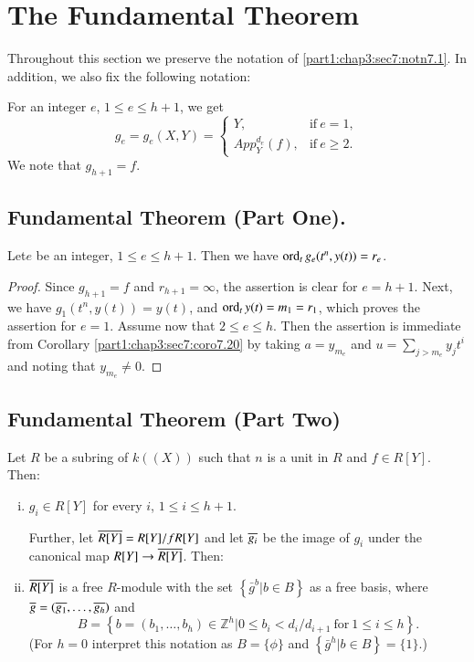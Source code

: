 \section{The Fundamental Theorem}\label{part1:chap3:sec8}

{\rm Throughout this section we preserve the notation of \ref{part1:chap3:sec7:notn7.1}. In addition, we also fix the following notation:}

\begin{notn}\label{part1:chap3:sec8:notn8.1}
  For an integer $e$, $1\leq e \leq h+1$, we get
$$
g_e = g_e (X, Y)= \begin{cases}
  Y, & \text{if}~ e=1,\\
  App_{Y}^{d_e} (f), & \text{if}~ e \geq 2.
\end{cases}
$$
We note that $g_{h+1}=f$.
\end{notn}

\setcounter{subsection}{1}
\subsection{Fundamental Theorem (Part One).} \label{part1:chap3:sec8:ss8.2}

Let\pageoriginale $e$ be an integer, $1 \leq e \leq h+1$. Then we have $\operatorname{ord}_t g_e (t^n, y(t))= r_e$.

\begin{proof}
  Since $g_{h+1}=f$ and $r_{h+1}= \infty$, the assertion is clear for $e= h+1$. Next, we have $g_1 (t^n, y(t))= y(t)$, and $\operatorname{ord}_t y(t) =m_1= r_1$, which proves the assertion for $e=1$. Assume now that $2 \leq e \leq h$. Then the assertion is immediate from Corollary \ref{part1:chap3:sec7:coro7.20} by taking $a= y_{m_e}$ and $u= \displaystyle{\sum_{j > m_e}} y_j t^i$ and noting that $y_{m_e} \neq 0$.
\end{proof}

\subsection{Fundamental Theorem (Part Two)}\label{part1:chap3:sec8:ss8.3}

Let $R$ be a subring of $k ((X))$ such that $n$ is a unit in $R$ and $f \in R [Y]$. Then:

\begin{enumerate}[(i)]
\item $g_i \in R [Y]$ for every $i$, $1 \leq i \leq h+1$.

  Further, let $\overline{R[Y]}= R[Y]/fR[Y]$ and let $\overline{g_i}$ be the image of $g_i$ under the canonical map $R[Y] \to \overline{R[Y]}$. Then:

\item $\overline{R[Y]}$ is a free $R$-module with the set $\left\{ \bar{g}^{b}\Big| b \in B\right\}$ as a free basis, where $\overline{g} = (\overline{g_1} , \ldots , \overline{g_h})$ and 
$$
B= \left\{ b = (b_1, \ldots , b_h) \in \mathbb{Z}^h \Big| 0 \leq b_i < d_i / d_{i+1}~ \text{for}~ 1 \leq i \leq h \right\}.
$$
(For $h=0$ interpret this notation as $B= \{ \phi \}$ and $\left\{\bar{g}^h \Big| b \in B \right\}= \{ 1\}$.)
\end{enumerate}


